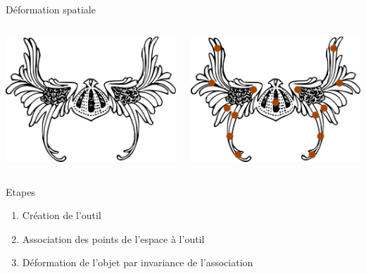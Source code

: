 \documentclass[xcolor=x11names,compress]{beamer}
\renewcommand{\(}{\begin{columns}} \renewcommand{\)}{\end{columns}}
\newcommand{\<}[1]{\begin{column}{#1}} \renewcommand{\>}{\end{column}}
\begin{document}
\begin{frame}{Déformation spatiale}
  \begin{columns}[t]
    \begin{column}{0.5\textwidth}
      \centering
      \includegraphics[scale=0.16]{Outil-Mono-Sans}
    \end{column}
    \begin{column}{0.5\textwidth}
      \centering
      \includegraphics[scale=0.16]{Outil-Mono-Points}
    \end{column}
  \end{columns}
  \begin{block}{Etapes}
    \begin{enumerate}
      \item Création de l'outil
      \item Association des points de l'espace à l'outil
      \item Déformation de l'objet par invariance de l'association
    \end{enumerate}
  \end{block}
\end{frame}
\end{document}
